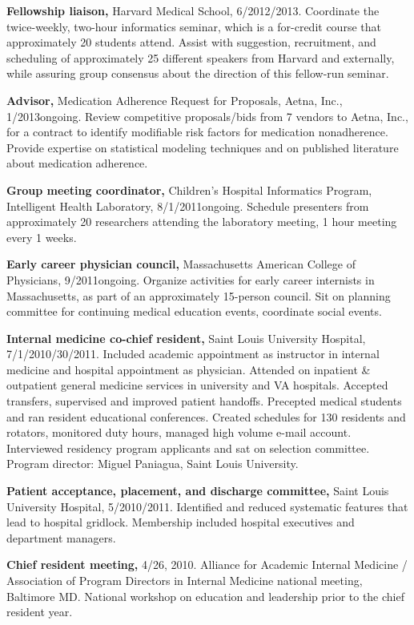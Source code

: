 \documentclass[12pt]{article}
\begin{document}
\textbf{Fellowship liaison,} Harvard Medical School,
6/2012/2013. Coordinate the twice-weekly, two-hour informatics
seminar, which is a for-credit course that approximately 20 students
attend. Assist with suggestion, recruitment, and scheduling of
approximately 25 different speakers from Harvard and externally, while
assuring group consensus about the direction of this fellow-run
seminar.

\textbf{Advisor,} Medication Adherence Request for Proposals, Aetna, Inc.,
1/2013\ndash{}ongoing. Review competitive proposals/bids from 7 vendors to
Aetna, Inc., for a contract to identify modifiable risk factors for
medication nonadherence. Provide expertise on statistical modeling
techniques and on published literature about medication adherence.

\textbf{Group meeting coordinator,} Children’s Hospital Informatics
Program, Intelligent Health Laboratory, 8/1/2011\ndash{}ongoing.
Schedule presenters from approximately 20 researchers attending the
laboratory meeting, 1 hour meeting every 1 weeks.

\textbf{Early career physician council,} Massachusetts American College of
Physicians, 9/2011\ndash{}ongoing. Organize activities for early career
internists in Massachusetts, as part of an approximately 15-person
council. Sit on planning committee for continuing medical education
events, coordinate social events.

\textbf{Internal medicine co-chief resident,} Saint Louis University
Hospital, 7/1/2010/30/2011. Included academic appointment as
instructor in internal medicine and hospital appointment as physician.
Attended on inpatient \& outpatient general medicine services in
university and VA hospitals. Accepted transfers, supervised and
improved patient handoffs. Precepted medical students and ran resident
educational conferences. Created schedules for 130 residents and
rotators, monitored duty hours, managed high volume e-mail account.
Interviewed residency program applicants and sat on selection
committee. Program director: Miguel Paniagua, Saint Louis University.

\textbf{Patient acceptance, placement, and discharge committee,} Saint
Louis University Hospital, 5/2010\ndash{}/2011. Identified
and reduced systematic features that lead to hospital gridlock.
Membership included hospital executives and department managers.

\textbf{Chief resident meeting,} 4/26, 2010. Alliance for
Academic Internal Medicine / Association of Program Directors in
Internal Medicine national meeting, Baltimore MD. National workshop on
education and leadership prior to the chief resident year.
\end{document}
